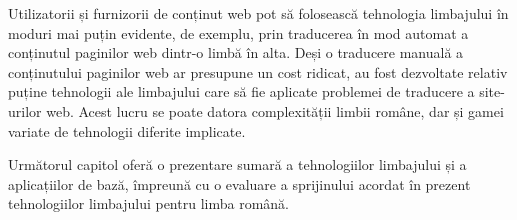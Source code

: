 \begin{multicols}{2}
Utilizatorii și furnizorii de conținut web pot să folosească tehnologia limbajului în moduri mai puțin evidente, de exemplu, prin traducerea în mod automat a conținutul paginilor web dintr-o limbă în alta. Deși o traducere manuală a conținutului paginilor web ar presupune un cost ridicat, au fost dezvoltate relativ puține tehnologii ale limbajului care să fie aplicate problemei de traducere a site-urilor web. Acest lucru se poate datora complexității limbii române, dar și gamei variate de tehnologii diferite implicate.

Următorul capitol oferă o prezentare sumară a tehnologiilor limbajului și a aplicațiilor de bază, împreună cu o evaluare a sprijinului acordat în prezent tehnologiilor limbajului pentru limba română.

\end{multicols}

\clearpage

